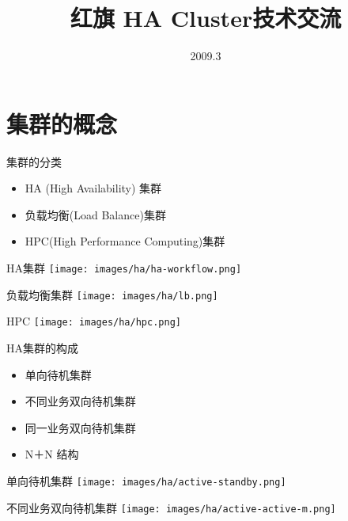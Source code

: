 \documentclass[compress,trans]{beamer} %
\title{红旗 HA Cluster技术交流}
\institute[北京中科红旗软件技术有限公司] %
{北京中科红旗软件技术有限公司}
\date{2009.3}
\begin{document}
\maketitle


\section{集群的概念}
\begin{frame}{集群的分类}
\begin{itemize}
\item HA (High Availability) 集群


\item 负载均衡(Load Balance)集群

\item HPC(High Performance Computing)集群

\end{itemize}
\end{frame}

\begin{frame}{HA集群}
\texttt{[image: images/ha/ha-workflow.png]} 
\end{frame}

\begin{frame}{负载均衡集群}
\texttt{[image: images/ha/lb.png]}
\end{frame}

\begin{frame}{HPC}
\texttt{[image: images/ha/hpc.png]}
\end{frame}

\begin{frame}{HA集群的构成}
\begin{itemize}
  \item 单向待机集群
  \item 不同业务双向待机集群
  \item 同一业务双向待机集群
  \item N＋N 结构
\end{itemize}
\end{frame}

\begin{frame}{单向待机集群}
\texttt{[image: images/ha/active-standby.png]}
\end{frame}

\begin{frame}{不同业务双向待机集群}
\texttt{[image: images/ha/active-active-m.png]}
\end{frame}
\end{document}
